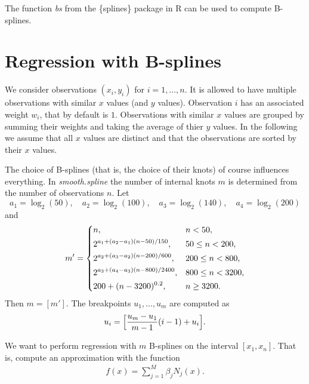 \documentclass[a4paper]{scrartcl}
\begin{document}
The function \textit{bs} from the \{splines\} package in R can be used to compute B-splines.


\section{Regression with B-splines}
\label{sec:regression}

We consider observations $(x_i, y_i)$ for $i = 1, \ldots, n$. 
It is allowed to have multiple observations with similar $x$ values (and $y$ values).
Observation $i$ has an associated weight $w_i$, that by default is $1$.
Observations with similar $x$ values are grouped by summing their weights and taking the average of thier $y$ values.
In the following we assume that all $x$ values are distinct and that the observations are sorted by their $x$ values.

The choice of B-splines (that is, the choice of their knots) of course influences everything.
In \textit{smooth.spline} the number of internal knots $m$ is determined from the number of observations $n$.
Let
\begin{equation*}
    a_1 = \log_2(50),
    \quad
    a_2 = \log_2(100),
    \quad
    a_3 = \log_2(140),
    \quad
    a_4 = \log_2(200)
\end{equation*}
and
\begin{equation*}
    m' =
    \begin{dcases}
        n, & n < 50,
        \\
        2^{a_1 + (a_2 - a_1) (n - 50) / 150}, & 50 \leq n < 200,
        \\
        2^{a_2 + (a_3 - a_2) (n - 200) / 600}, & 200 \leq n < 800,
        \\
        2^{a_3 + (a_4 - a_3) (n - 800) / 2400}, & 800 \leq n < 3200,
        \\
        200 + (n - 3200)^{0.2}, & n \geq 3200.
    \end{dcases}
\end{equation*}
Then $m = [m']$.
The breakpoints $u_1, \dots, u_m$ are computed as
\begin{equation*}
    u_i = \Bigl[\frac{u_m - u_1}{m - 1} (i - 1) + u_i\Bigr].
\end{equation*}

We want to perform regression with $m$ B-splines on the interval $[x_1, x_n]$.
That is, compute an approximation with the function
\begin{align*}
    f(x) = \sum_{j=1}^M \beta_j N_j(x).
\end{align*}
\end{document}

